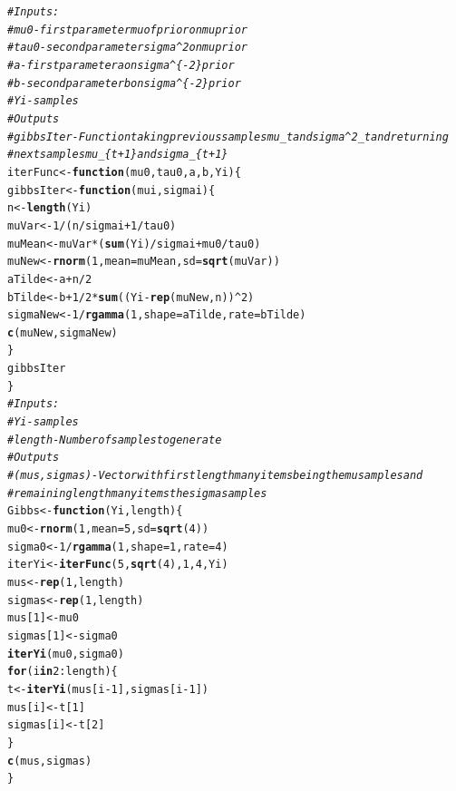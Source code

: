 \documentclass{article}\usepackage[]{graphicx}\usepackage[]{xcolor}
\makeatletter
\newcommand{\hlnum}[1]{\textcolor[rgb]{0.686,0.059,0.569}{#1}}%
\newcommand{\hlcom}[1]{\textcolor[rgb]{0.678,0.584,0.686}{\textit{#1}}}%
\newcommand{\hlopt}[1]{\textcolor[rgb]{0,0,0}{#1}}%
\newcommand{\hldef}[1]{\textcolor[rgb]{0.345,0.345,0.345}{#1}}%
\newcommand{\hlkwa}[1]{\textcolor[rgb]{0.161,0.373,0.58}{\textbf{#1}}}%
\newcommand{\hlkwb}[1]{\textcolor[rgb]{0.69,0.353,0.396}{#1}}%
\newcommand{\hlkwc}[1]{\textcolor[rgb]{0.333,0.667,0.333}{#1}}%
\newcommand{\hlkwd}[1]{\textcolor[rgb]{0.737,0.353,0.396}{\textbf{#1}}}%
\newenvironment{kframe}{%
 \def\at@end@of@kframe{}%
 \ifinner\ifhmode%
  \def\at@end@of@kframe{\end{minipage}}%
  \begin{minipage}{\columnwidth}%
 \fi\fi%
 \def\FrameCommand##1{\hskip\@totalleftmargin \hskip-\fboxsep
 \colorbox{shadecolor}{##1}\hskip-\fboxsep
     \hskip-\linewidth \hskip-\@totalleftmargin \hskip\columnwidth}%
 \MakeFramed {\advance\hsize-\width
   \@totalleftmargin\z@ \linewidth\hsize
   \@setminipage}}%
 {\par\unskip\endMakeFramed%
 \at@end@of@kframe}
\newenvironment{knitrout}{}{} %
\makeatother
\begin{document}
\begin{knitrout}
\begin{kframe}
\begin{alltt}
\hlcom{# Inputs:}
\hlcom{# mu0 - first parameter mu of prior on mu prior}
\hlcom{# tau0 - second parameter sigma^2 on mu prior}
\hlcom{# a - first parameter a on sigma^\{-2\} prior}
\hlcom{# b - second parameter b on sigma^\{-2\} prior}
\hlcom{# Yi - samples}
\hlcom{# Outputs}
\hlcom{# gibbsIter - Function taking previous samples mu_t and sigma^2_t and returning}
\hlcom{# next samples mu_\{t+1\} and sigma_\{t+1\}}
\hldef{iterFunc} \hlkwb{<-} \hlkwa{function}\hldef{(}\hlkwc{mu0}\hldef{,} \hlkwc{tau0}\hldef{,} \hlkwc{a}\hldef{,} \hlkwc{b}\hldef{,} \hlkwc{Yi}\hldef{) \{}
  \hldef{gibbsIter} \hlkwb{<-} \hlkwa{function}\hldef{(}\hlkwc{mui}\hldef{,} \hlkwc{sigmai}\hldef{) \{}
    \hldef{n} \hlkwb{<-} \hlkwd{length}\hldef{(Yi)}
    \hldef{muVar} \hlkwb{<-} \hlnum{1} \hlopt{/} \hldef{(n} \hlopt{/} \hldef{sigmai} \hlopt{+} \hlnum{1} \hlopt{/} \hldef{tau0)}
    \hldef{muMean} \hlkwb{<-} \hldef{muVar} \hlopt{*} \hldef{(}\hlkwd{sum}\hldef{(Yi)} \hlopt{/} \hldef{sigmai} \hlopt{+} \hldef{mu0} \hlopt{/} \hldef{tau0)}
    \hldef{muNew} \hlkwb{<-} \hlkwd{rnorm}\hldef{(}\hlnum{1}\hldef{,} \hlkwc{mean} \hldef{= muMean,} \hlkwc{sd} \hldef{=} \hlkwd{sqrt}\hldef{(muVar))}
    \hldef{aTilde} \hlkwb{<-} \hldef{a} \hlopt{+} \hldef{n} \hlopt{/} \hlnum{2}
    \hldef{bTilde} \hlkwb{<-} \hldef{b} \hlopt{+} \hlnum{1} \hlopt{/} \hlnum{2} \hlopt{*} \hlkwd{sum}\hldef{((Yi} \hlopt{-} \hlkwd{rep}\hldef{(muNew, n))}\hlopt{^}\hlnum{2}\hldef{)}
    \hldef{sigmaNew} \hlkwb{<-} \hlnum{1} \hlopt{/} \hlkwd{rgamma}\hldef{(}\hlnum{1}\hldef{,} \hlkwc{shape} \hldef{= aTilde,} \hlkwc{rate} \hldef{= bTilde)}
    \hlkwd{c}\hldef{(muNew, sigmaNew)}
  \hldef{\}}
  \hldef{gibbsIter}
\hldef{\}}
\hlcom{# Inputs:}
\hlcom{# Yi - samples}
\hlcom{# length - Number of samples to generate}
\hlcom{# Outputs}
\hlcom{# (mus, sigmas) - Vector with first length many items being the mu samples and}
\hlcom{# remaining length many items the sigma samples}
\hldef{Gibbs} \hlkwb{<-} \hlkwa{function}\hldef{(}\hlkwc{Yi}\hldef{,} \hlkwc{length}\hldef{) \{}
  \hldef{mu0} \hlkwb{<-} \hlkwd{rnorm}\hldef{(}\hlnum{1}\hldef{,} \hlkwc{mean} \hldef{=} \hlnum{5}\hldef{,} \hlkwc{sd} \hldef{=} \hlkwd{sqrt}\hldef{(}\hlnum{4}\hldef{))}
  \hldef{sigma0} \hlkwb{<-} \hlnum{1} \hlopt{/} \hlkwd{rgamma}\hldef{(}\hlnum{1}\hldef{,} \hlkwc{shape} \hldef{=} \hlnum{1}\hldef{,} \hlkwc{rate} \hldef{=} \hlnum{4}\hldef{)}
  \hldef{iterYi} \hlkwb{<-} \hlkwd{iterFunc}\hldef{(}\hlnum{5}\hldef{,} \hlkwd{sqrt}\hldef{(}\hlnum{4}\hldef{),} \hlnum{1}\hldef{,} \hlnum{4}\hldef{, Yi)}
  \hldef{mus} \hlkwb{<-} \hlkwd{rep}\hldef{(}\hlnum{1}\hldef{, length)}
  \hldef{sigmas} \hlkwb{<-} \hlkwd{rep}\hldef{(}\hlnum{1}\hldef{, length)}
  \hldef{mus[}\hlnum{1}\hldef{]} \hlkwb{<-} \hldef{mu0}
  \hldef{sigmas[}\hlnum{1}\hldef{]} \hlkwb{<-} \hldef{sigma0}
  \hlkwd{iterYi}\hldef{(mu0, sigma0)}
  \hlkwa{for} \hldef{(i} \hlkwa{in} \hlnum{2}\hlopt{:}\hldef{length) \{}
    \hldef{t} \hlkwb{<-} \hlkwd{iterYi}\hldef{(mus[i} \hlopt{-} \hlnum{1}\hldef{], sigmas[i} \hlopt{-} \hlnum{1}\hldef{])}
    \hldef{mus[i]} \hlkwb{<-} \hldef{t[}\hlnum{1}\hldef{]}
    \hldef{sigmas[i]} \hlkwb{<-} \hldef{t[}\hlnum{2}\hldef{]}
  \hldef{\}}
  \hlkwd{c}\hldef{(mus, sigmas)}
\hldef{\}}


\end{alltt}
\end{kframe}
\end{knitrout}
\end{document}
